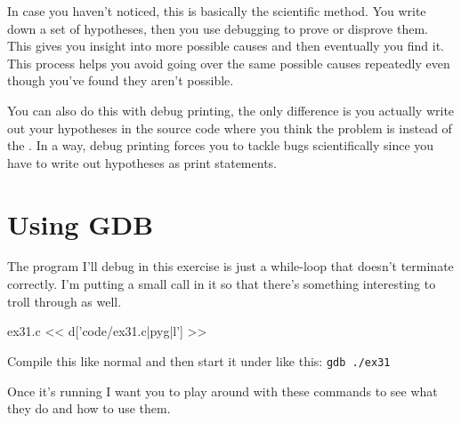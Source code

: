 In case you haven't noticed, this is basically the scientific method.  You
write down a set of hypotheses, then you use debugging to prove or disprove
them.  This gives you insight into more possible causes and then eventually you
find it. This process helps you avoid going over the same possible causes
repeatedly even though you've found they aren't possible.

You can also do this with debug printing, the only difference is you actually
write out your hypotheses in the source code where you think the problem is
instead of the .  In a way, debug printing forces you to tackle
bugs scientifically since you have to write out hypotheses as print statements.


\section{Using GDB}

The program I'll debug in this exercise is just a while-loop that doesn't
terminate correctly.  I'm putting a small  call in it so that
there's something interesting to troll through as well.

\begin{code}{ex31.c}
<< d['code/ex31.c|pyg|l'] >>
\end{code}

Compile this like normal and then start it under  like this:  \verb|gdb ./ex31|

Once it's running I want you to play around with these  commands
to see what they do and how to use them.

